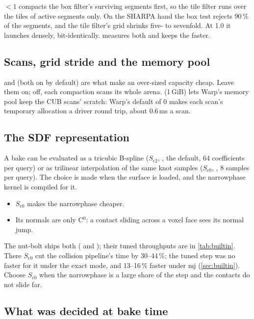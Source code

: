  $< 1$ compacts the box filter's surviving segments first, so the tile filter runs over the tiles of active segments only. On the SHARPA hand the box test rejects 90\,\% of the segments, and the tile filter's grid shrinks five- to sevenfold. At 1.0 it launches densely, bit-identically.  measures both and keeps the faster.

\subsection{Scans, grid stride and the memory pool}\label{sec:scans}

 and  (both on by default) are what make an over-sized capacity cheap. Leave them on; off, each compaction scans its whole arena.  (1\,GiB) lets Warp's memory pool keep the CUB scans' scratch: Warp's default of 0 makes each scan's temporary allocation a driver round trip, about 0.6\,ms a scan.

\subsection{The SDF representation}\label{sec:spline}

A bake can be evaluated as a tricubic B-spline ($S_{\mathrm{c2}}$, , the default, 64 coefficients per query) or as trilinear interpolation of the same knot samples ($S_{\mathrm{c0}}$, , 8 samples per query). The choice is made when the surface is loaded, and the narrowphase kernel is compiled for it.

\begin{itemize}
\item $S_{\mathrm{c0}}$ makes the narrowphase cheaper.
\item Its normals are only C$^0$: a contact sliding across a voxel face sees its normal jump.
\end{itemize}

The nut-bolt ships both ( and ); their tuned throughputs are in \cref{tab:builtin}. There $S_{\mathrm{c0}}$ cut the collision pipeline's time by 30--44\,\%; the tuned step was no faster for it under the exact mode, and 13--16\,\% faster under mj (\cref{sec:builtin}). Choose $S_{\mathrm{c0}}$ when the narrowphase is a large share of the step and the contacts do not slide far.

\subsection{What was decided at bake time}\label{sec:asset}

